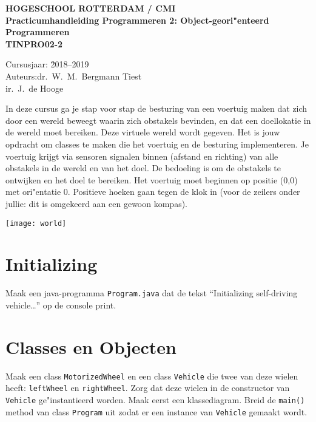 \documentclass[a4paper,10pt]{article}
\newcommand{\code}[1]{\texttt{#1}}
\begin{document}
\begin{center}
\vspace*{4cm}
\MakeUppercase{\Large\bfseries Hogeschool Rotterdam / CMI}\\
\vspace{3cm}
\textbf{\fontsize{48}{60}\selectfont Practicumhandleiding Programmeren 2: Object-geori"enteerd Programmeren}\\
\vspace{2cm}
\MakeUppercase{\Large\bfseries tinpro02-2}\\
\end{center}
\vspace{4cm}
\begin{tabbing}
Cursusjaar: \=2018--2019\\
Auteurs:\>dr.\ W.\ M.\ Bergmann Tiest\\
\>ir.\ J.\ de Hooge
\end{tabbing}
\newpage
%
\tableofcontents
\newpage
%
In deze cursus ga je stap voor stap de besturing van een voertuig maken dat zich door een wereld beweegt waarin zich obstakels bevinden, en dat een doellokatie in de wereld moet bereiken. Deze virtuele wereld wordt gegeven. Het is jouw opdracht om classes te maken die het voertuig en de besturing implementeren. Je voertuig krijgt via sensoren signalen binnen (afstand en richting) van alle obstakels in de wereld en van het doel. De bedoeling is om de obstakels te ontwijken en het doel te bereiken. Het voertuig moet beginnen op positie (0,0) met ori"entatie 0\textdegree{}. Positieve hoeken gaan tegen de klok in (voor de zeilers onder jullie: dit is omgekeerd aan een gewoon kompas).\\
\centerline{\texttt{[image: world]}}
\section{Initializing}
Maak een java-programma \code{Program.java} dat de tekst ``Initializing self-driving vehicle\dots'' op de console print.
\section{Classes en Objecten}
Maak een class \code{MotorizedWheel} en een class \code{Vehicle} die twee van deze wielen heeft: \code{leftWheel} en \code{rightWheel}. Zorg dat deze wielen in de constructor van \code{Vehicle} ge"instantieerd worden. Maak eerst een klassediagram. Breid de \code{main()} method van class \code{Program} uit zodat er een instance van \code{Vehicle} gemaakt wordt.
\end{document}
